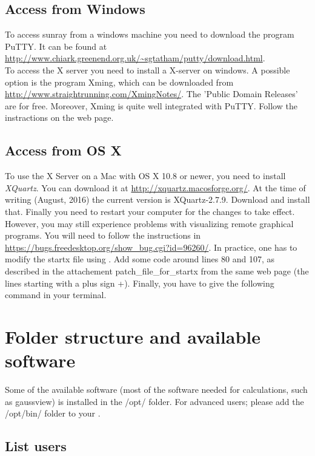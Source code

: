 \documentclass{article}
\begin{document}
\subsection*{Access from Windows}

To access sunray from a windows machine you need to download the program PuTTY. It can be found at \url{http://www.chiark.greenend.org.uk/~sgtatham/putty/download.html}.\\

To access the X server you need to install a X-server on windows.
A possible option is the program Xming, which can be downloaded from \url{http://www.straightrunning.com/XmingNotes/}. The 'Public Domain Releases' are for free.
Moreover, Xming is quite well integrated with PuTTY. Follow the instractions on the web page.


\subsection*{Access from OS X}

To use the X Server on a Mac with OS X 10.8 or newer, you need to install \emph{XQuartz}.
You can download it at \url{http://xquartz.macosforge.org/}.
At the time of writing (August, 2016) the current version is XQuartz-2.7.9.
Download and install that.
Finally you need to restart your computer for the changes to take effect.
However, you may still experience problems with visualizing remote graphical programs.
You will need to follow the instructions in \url{https://bugs.freedesktop.org/show_bug.cgi?id=96260/}.
In practice, one has to modify the startx file using .
Add some code around lines 80 and 107, as described in the attachement patch\_file\_for\_startx from the same web page (the lines starting with a plus sign +).
Finally, you have to give the following command  in your terminal.


\newpage
\section{Folder structure and available software}

Some of the available software (most of the software needed for calculations, such as gaussview) is installed in the /opt/ folder.
For advanced users; please add the /opt/bin/ folder to your .\\

\subsection*{List users}
\end{document}
